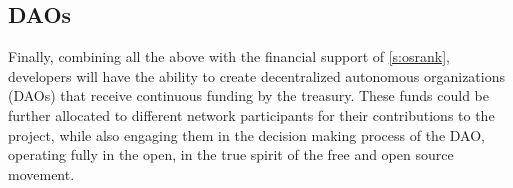 \subsection{DAOs}
Finally, combining all the above with the financial support of \osrank{} \ref{s:osrank}, 
developers will have the ability to create decentralized autonomous organizations (DAOs) 
that receive continuous funding by the \oscoin{} treasury. These funds could be further 
allocated to different network participants for their contributions to the project, while 
also engaging them in the decision making process of the DAO, operating fully in the open, 
in the true spirit of the free and open source movement.

